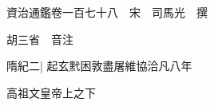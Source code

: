 






























































資治通鑑卷一百七十八　宋　司馬光　撰

胡三省　音注

隋紀二|{
	起玄黓困敦盡屠維協洽凡八年}


高祖文皇帝上之下

